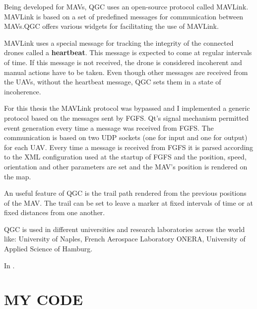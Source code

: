 Being developed for MAVs,  QGC uses
an open-source protocol called MAVLink. MAVLink is based on a set of predefined
messages for communication between MAVs.QGC offers various widgets for facilitating
the use of MAVLink.

MAVLink uses a special message for tracking the integrity of the connected drones
called a \textbf{heartbeat}. This message is expected to come at regular intervals
of time. If this message is not received, the drone is considered incoherent
and manual actions have to be taken. Even though other messages are received from
the UAVs, without the heartbeat message, QGC sets them in a state of incoherence.

For this thesis the MAVLink protocol was bypassed and I implemented a generic
protocol based on the messages sent by FGFS. Qt's signal mechanism permitted
event generation every time a message was received from FGFS. The communication
is based on two UDP sockets (one for input and one for output) for each UAV. 
Every time a message is received from FGFS it is parsed according to the XML 
configuration used at the startup of FGFS and the position, speed, orientation
and other parameters are set and the MAV's position is rendered on the map.

An useful feature of QGC is the trail path rendered from the previous positions
of the MAV. The trail can be set to leave a marker at fixed intervals of time
or at fixed distances from one another.

QGC is used in different universities and research laboratories across the world 
like: University of Naples, French Aerospace Laboratory ONERA,  University of 
Applied Science of Hamburg.

In .

\newpage
\section{MY CODE}
\label{sec:fgfs}
